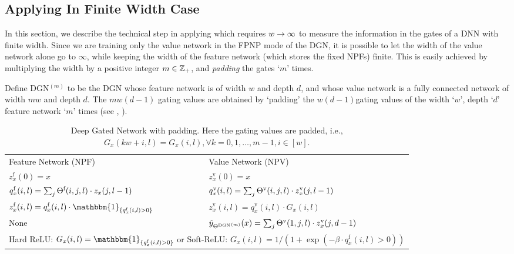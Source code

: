 \begin{appendix}
\section{Applying  In Finite Width Case}\label{sec:finite}
In this section, we describe the technical step in applying  which requires $w\rightarrow\infty$ to measure the information in the gates of a DNN  with finite width.  Since we are training only the value network in the FPNP mode of the DGN, it is possible to let the width of the value network alone go to $\infty$, while keeping the width of the feature network (which stores the fixed NPFs) finite. This is easily achieved by multiplying the width by a positive integer $m\in\mathbb{Z}_{+}$, and \emph{padding} the gates `$m$' times.
\begin{definition}
Define DGN${}^{(m)}$ to be the DGN whose feature network is of width $w$ and depth $d$, and whose value network  is a fully connected network of width $mw$ and depth $d$. The $mw(d-1)$ gating values are obtained by `padding' the $w(d-1)$gating values of the width `$w$', depth `$d$' feature network `$m$' times (see , ). 
\end{definition}
\FloatBarrier
\begin{table}[h]
\centering
\begin{tabular}{|  l | l |}\hline
 Feature Network (NPF)& Value Network (NPV)\\
 $z^{\text{f}}_{x}(0)=x$ &$z^{\text{v}}_{x}(0)=x$ \\
$q^{\text{f}}_{x}(i,l)=\sum_{j} \Theta^{\textrm{f}}(i,j,l)\cdot z_{x}(j,l-1)$ & $q^{\text{v}}_{x}(i,l)=\sum_{j} {\Theta}^{\text{v}}(i,j,l)\cdot z^{\text{v}}_{x}(j,l-1)$\\
$z^{\text{f}}_{x}(i,l)= q^{\text{f}}_{x}(i,l)\cdot\mathbbm{1}_{\{q^{\text{f}}_{x}(i,l)>0\}}$& $z^{\text{v}}_{x}(i,l)= q^{\text{v}}_{x}(i,l)\cdot G_{x}(i,l)$ \\
 None &$\hat{y}_{{\Theta^{\text{DGN}}}^{(m)}}(x)= \sum_{j} {\Theta}^{\text{v}}(1,j,l)\cdot z^{\text{v}}_{x}(j,d-1)$\\\hline
\multicolumn{2}{|l|}{{Hard ReLU: $G_{x}(i,l)=\mathbbm{1}_{\{q^{\text{f}}_{x}(i,l)>0\}}$ or Soft-ReLU: $G_{x}(i,l)={1}/{\left(1+\exp(-\beta\cdot q^{\text{f}}_{x}(i,l)>0)\right)} $}}\\\hline
\end{tabular}
\caption{Deep Gated Network with padding. Here the gating values are padded, i.e., $ G_{x}(kw+i,l)=G_{x}(i,l),\forall k=0,1,\ldots,m-1, i\in[w]$. }
\label{tb:dgnpad}
\end{table}




\end{appendix}
